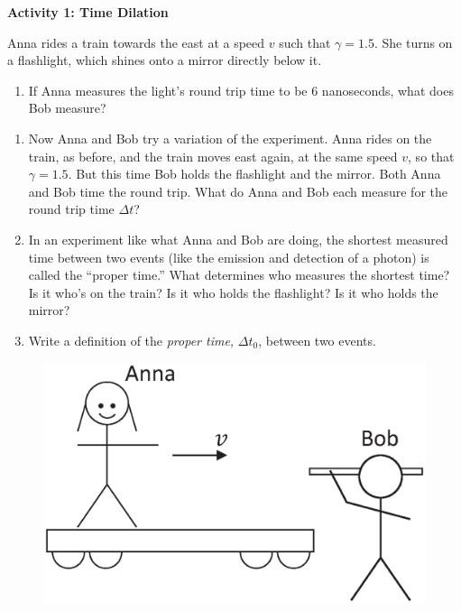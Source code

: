 \textbf{Activity 1: Time Dilation}

Anna rides a train towards the east at a speed $v$ such that $\gamma=1.5$.  She turns on a flashlight, which shines onto a mirror directly below it.

\begin{enumerate}[labparts]
\item If Anna measures the light's round trip time to be 6 nanoseconds, what does Bob measure?
\answerspace{0.5in}
\end{enumerate}

\begin{enumerate}
\item Now Anna and Bob try a variation of the experiment.  Anna rides on the train, as before, and the train moves east again, at the same speed $v$, so that $\gamma=1.5$.  But this time Bob holds the flashlight and the mirror.  Both Anna and Bob time the round trip.  What do Anna and Bob each measure for the round trip time $\Delta t$?
\answerspace{0.5in}

\item In an experiment like what Anna and Bob are doing, the shortest measured time between two events (like the emission and detection of a photon) is called the ``proper time.''  What determines who measures the shortest time? Is it who's on the train?  Is it who holds the flashlight?  Is it who holds the mirror?
\answerspace{0.5in}

\item Write a definition of the \textit{proper time,} $\Delta t_0$, between two events.
\answerspace{0.5in}
\end{enumerate}

\begin{figure}
\begin{center}
\vspace{-0.4in}
\includegraphics[scale=0.4]{time_dilation_length_contraction/anna_and_bob2.eps}
\end{center}
\end{figure}


